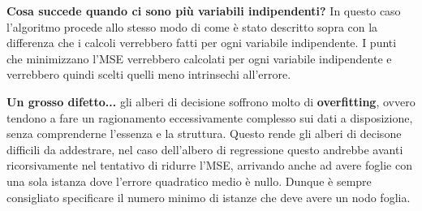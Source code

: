 \documentclass[a4paper, 11pt, oneside]{report}
\begin{document}
                \bigskip \bigskip
                \par \noindent \textbf{Cosa succede quando ci sono più variabili indipendenti?} In questo caso l'algoritmo
                procede allo stesso modo di come è stato descritto sopra con la differenza che i calcoli verrebbero fatti
                per ogni variabile indipendente. I punti che minimizzano l'MSE verrebbero calcolati per ogni variabile
                indipendente e verrebbero quindi scelti quelli meno intrinsechi all'errore.
                \\
                \par \noindent \textbf{Un grosso difetto...} gli alberi di decisione soffrono molto di \textbf{overfitting},
                ovvero tendono a fare un ragionamento eccessivamente complesso sui dati a disposizione, senza comprenderne
                l'essenza e la struttura. Questo rende gli alberi di decisone difficili da addestrare, nel caso dell'albero
                di regressione questo andrebbe avanti ricorsivamente nel tentativo di ridurre l'MSE, arrivando anche ad
                avere foglie con una sola istanza dove l'errore quadratico medio è nullo. Dunque è sempre consigliato
                specificare il numero minimo di istanze che deve avere un nodo foglia.

                \newpage
\end{document}
